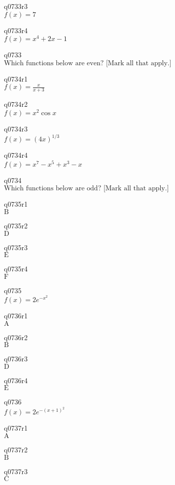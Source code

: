 q0733r3\\
\(\displaystyle f(x) = 7 \)

q0733r4\\
\(\displaystyle f(x) = x^4 + 2x - 1 \)

q0733\\
\(\displaystyle \text{Which functions below are even? [Mark all that apply.]} \)

q0734r1\\
\(\displaystyle f(x) = \frac{x}{x + 3} \)

q0734r2\\
\(\displaystyle f(x) = x^2 \cos x \)

q0734r3\\
\(\displaystyle f(x) = (4x)^{1/3} \)

q0734r4\\
\(\displaystyle f(x) = x^7 - x^5 + x^3 - x \)

q0734\\
\(\displaystyle \text{Which functions below are odd? [Mark all that apply.]} \)

q0735r1\\
\(\displaystyle \text{B} \)

q0735r2\\
\(\displaystyle \text{D} \)

q0735r3\\
\(\displaystyle \text{E} \)

q0735r4\\
\(\displaystyle \text{F} \)

q0735\\
\(\displaystyle f(x) = 2e^{-x^2} \)

q0736r1\\
\(\displaystyle \text{A} \)

q0736r2\\
\(\displaystyle \text{B} \)

q0736r3\\
\(\displaystyle \text{D} \)

q0736r4\\
\(\displaystyle \text{E} \)

q0736\\
\(\displaystyle f(x) = 2e^{-(x+1)^2} \)

q0737r1\\
\(\displaystyle \text{A} \)

q0737r2\\
\(\displaystyle \text{B} \)

q0737r3\\
\(\displaystyle \text{C} \)

